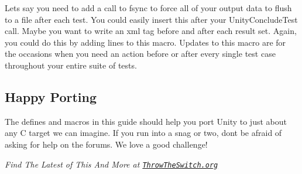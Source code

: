Let\textquotesingle{}s say you need to add a call to {\ttfamily fsync} to force all of your output data to flush to a file after each test. You could easily insert this after your {\ttfamily Unity\+Conclude\+Test} call. Maybe you want to write an xml tag before and after each result set. Again, you could do this by adding lines to this macro. Updates to this macro are for the occasions when you need an action before or after every single test case throughout your entire suite of tests.

\subsection*{Happy Porting}

The defines and macros in this guide should help you port Unity to just about any C target we can imagine. If you run into a snag or two, don\textquotesingle{}t be afraid of asking for help on the forums. We love a good challenge!

{\itshape Find The Latest of This And More at \href{https://throwtheswitch.org}{\tt Throw\+The\+Switch.\+org}} 